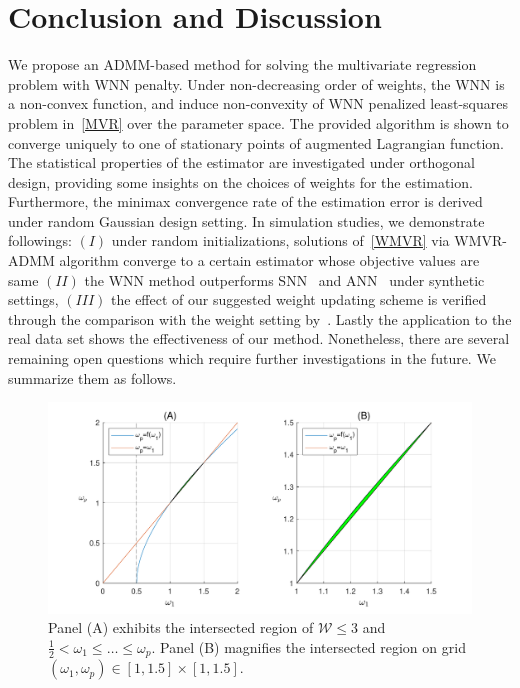 \documentclass[alpha-refs]{wiley-article}
\begin{document}
\section{Conclusion and Discussion} \label{Disc}
We propose an ADMM-based method for solving the multivariate regression problem with WNN penalty.
Under non-decreasing order of weights, the WNN is a non-convex function, and induce non-convexity of WNN penalized least-squares
problem in~\eqref{MVR} over the parameter space.
The provided algorithm is shown to converge uniquely to one of stationary points of augmented Lagrangian function.
The statistical properties of the estimator are investigated under orthogonal design, providing some insights on the choices of weights for the estimation.
Furthermore, the minimax convergence rate of the estimation error is derived under random Gaussian design setting.
In simulation studies, we demonstrate followings:
$(I)$  under random initializations, solutions of~\eqref{WMVR} via WMVR-ADMM algorithm converge to a certain estimator whose objective values are same
$(II)$ the WNN method outperforms SNN~\citep{yuan2007dimension} and ANN~\citep{chen2013reduced} under synthetic settings,
$(III)$ the effect of our suggested weight updating scheme is verified through the comparison with the weight setting by~\citet{chen2013reduced}.
Lastly the application to the real data set shows the effectiveness of our method.
Nonetheless, there are several remaining open questions which require further investigations in the future.
We summarize them as follows.
\begin{figure} [t!]
  \includegraphics[width=130mm]{Figure/Fig3.pdf}
  \centering
  \caption{ Panel (A) exhibits the intersected region of $\mathcal{W} \leq 3$ and $\frac{1}{2} < \omega_{1} \leq \dots \leq \omega_{p}$. Panel (B) magnifies the intersected region on grid $(\omega_{1},\omega_{p})\in[1,1.5] \times [1,1.5]$. }
  \label{Fig6}
\end{figure}
\end{document}
